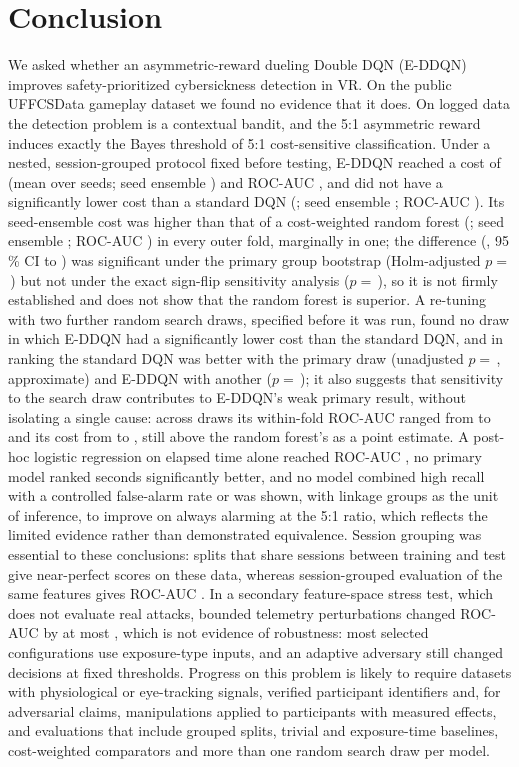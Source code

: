 \section{Conclusion}
\label{sec:conclusion}
We asked whether an asymmetric-reward dueling Double DQN (E-DDQN) improves safety-prioritized cybersickness detection in VR. On the public UFFCSData gameplay dataset we found no evidence that it does. On logged data the detection problem is a contextual bandit, and the 5:1 asymmetric reward induces exactly the Bayes threshold of 5:1 cost-sensitive classification. Under a nested, session-grouped protocol fixed before testing, E-DDQN reached a cost of \EDDQNCostCostMean{} (mean over seeds; seed ensemble \PHEnsEDDQNCost) and ROC-AUC \EDDQNCostRocAucMean, and did not have a significantly lower cost than a standard DQN (\DQNCostCostMean; seed ensemble \PHEnsDQNCost; ROC-AUC \DQNCostRocAucMean). Its seed-ensemble cost was higher than that of a cost-weighted random forest (\RFCostCostMean; seed ensemble \PHEnsRFCost; ROC-AUC \RFCostRocAucMean) in every outer fold, marginally in one; the difference (\PairDOneRFCostDiff, 95\,\% CI \PairDOneRFCostLo{} to \PairDOneRFCostHi) was significant under the primary group bootstrap (Holm-adjusted $p=$\,\PHHolmRF) but not under the exact sign-flip sensitivity analysis ($p=$\,\PHSfRFHolm), so it is not firmly established and does not show that the random forest is superior. A re-tuning with two further random search draws, specified before it was run, found no draw in which E-DDQN had a significantly lower cost than the standard DQN, and in ranking the standard DQN was better with the primary draw (unadjusted $p=$\,\SDPairOneAucP, approximate) and E-DDQN with another ($p=$\,\SDPairTwoAucP); it also suggests that sensitivity to the search draw contributes to E-DDQN's weak primary result, without isolating a single cause: across draws its within-fold ROC-AUC ranged from \SDEDDQNWfMin{} to \SDEDDQNWfMax{} and its cost from \SDEDDQNCostMin{} to \SDEDDQNCostMax, still above the random forest's as a point estimate. A post-hoc logistic regression on elapsed time alone reached ROC-AUC \PHTimeLRRocAucMean, no primary model ranked seconds significantly better, and no model combined high recall with a controlled false-alarm rate or was shown, with linkage groups as the unit of inference, to improve on always alarming at the 5:1 ratio, which reflects the limited evidence rather than demonstrated equivalence. Session grouping was essential to these conclusions: splits that share sessions between training and test give near-perfect scores on these data, whereas session-grouped evaluation of the same features gives ROC-AUC \LeakGrpRocAuc. In a secondary feature-space stress test, which does not evaluate real attacks, bounded telemetry perturbations changed ROC-AUC by at most \AttAucMaxAbsChange, which is not evidence of robustness: most selected configurations use exposure-type inputs, and an adaptive adversary still changed decisions at fixed thresholds. Progress on this problem is likely to require datasets with physiological or eye-tracking signals, verified participant identifiers and, for adversarial claims, manipulations applied to participants with measured effects, and evaluations that include grouped splits, trivial and exposure-time baselines, cost-weighted comparators and more than one random search draw per model.
